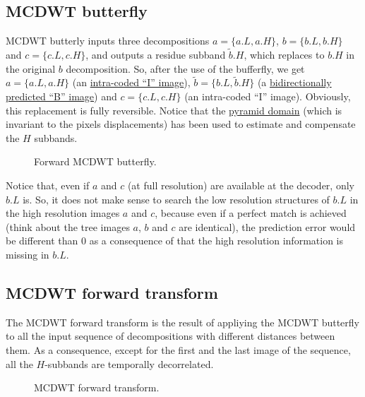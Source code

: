 \subsection{MCDWT butterfly}

MCDWT butterly inputs three decompositions $a=\{a.L, a.H\}$, $b=\{b.L,
b.H\}$ and $c=\{c.L, c.H\}$, and outputs a residue subband
$\tilde{b}.H$, which replaces to $b.H$ in the original $b$
decomposition. So, after the use of the bufferfly, we get $a=\{a.L,
a.H\}$ (an
\href{https://en.wikipedia.org/wiki/Video_compression_picture_types}{intra-coded
  ``I'' image}), $\tilde{b}=\{b.L, \tilde{b}.H\}$ (a
\href{https://en.wikipedia.org/wiki/Video_compression_picture_types}{bidirectionally
  predicted ``B'' image}) and $c=\{c.L, c.H\}$ (an intra-coded ``I''
image). Obviously, this replacement is fully reversible. Notice that
the
\href{http://www.vtvt.ece.vt.edu/research/references/video/DCT_Video_Compression/Zhang92a.pdf}{pyramid
  domain} (which is invariant to the pixels displacements) has been
used to estimate and compensate the $H$ subbands.

\begin{figure}
\centering
{}
\caption{Forward MCDWT butterfly.}
\end{figure}


Notice that, even if $a$ and $c$ (at full resolution) are available at
the decoder, only $b.L$ is. So, it does not make sense to search the
low resolution structures of $b.L$ in the high resolution images $a$
and $c$, because even if a perfect match is achieved (think about the
tree images $a$, $b$ and $c$ are identical), the prediction error
would be different than $0$ as a consequence of that the high
resolution information is missing in $b.L$.

\subsection{MCDWT forward transform}

The MCDWT forward transform is the result of appliying the MCDWT
butterfly to all the input sequence of decompositions with different
distances between them. As a consequence, except for the first and the
last image of the sequence, all the $H$-subbands are temporally
decorrelated.

\begin{figure}
\centering
{}
\caption{MCDWT forward transform.\label{fig:forward_MCDWT}}
\end{figure}


